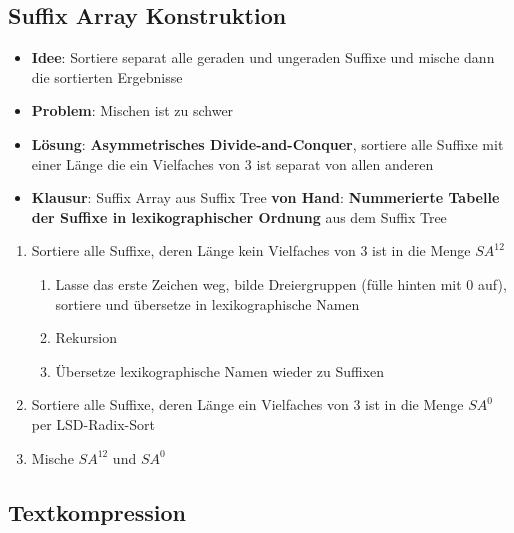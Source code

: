 \documentclass[10pt,a4paper]{article}
\begin{document}
	\subsection{Suffix Array Konstruktion}
	\label{str:sub:suffix_array_konstruktion}
	
	\begin{itemize}
		\item \textbf{Idee}: Sortiere separat alle geraden und ungeraden Suffixe und mische dann die sortierten Ergebnisse
		\item \textbf{Problem}: Mischen ist zu schwer
		\item \textbf{Lösung}: \textbf{Asymmetrisches Divide-and-Conquer}, sortiere alle Suffixe mit einer Länge die ein Vielfaches von 3 ist separat von allen anderen
		\item \textbf{Klausur}: Suffix Array aus Suffix Tree \textbf{von Hand}: \textbf{Nummerierte Tabelle der Suffixe in lexikographischer Ordnung} aus dem Suffix Tree
	\end{itemize}

	\begin{enumerate}
		\item Sortiere alle Suffixe, deren Länge kein Vielfaches von $3$ ist in die Menge $SA^{12}$
		\begin{enumerate}
			\item Lasse das erste Zeichen weg, bilde Dreiergruppen (fülle hinten mit $0$ auf), sortiere und übersetze in lexikographische Namen
			\item Rekursion %
			\item Übersetze lexikographische Namen wieder zu Suffixen
		\end{enumerate}
		\item Sortiere alle Suffixe, deren Länge ein Vielfaches von $3$ ist in die Menge $SA^0$ per LSD-Radix-Sort
		\item Mische $SA^{12}$ und $SA^0$
	\end{enumerate}

	\subsection{Textkompression}
	\label{str:sub:textkompression}
	
\end{document}
